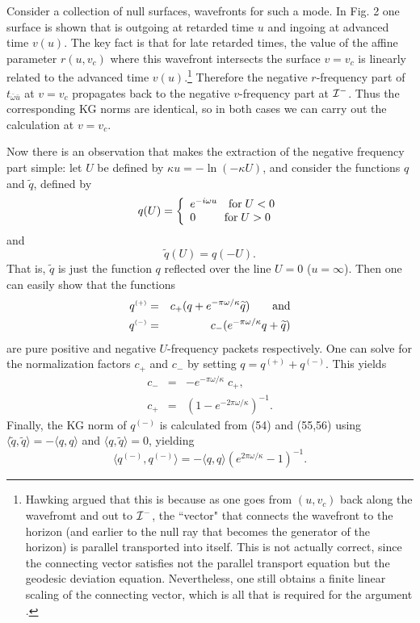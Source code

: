 \documentclass[12pt]{article}
\def\o{\omega}
\def\obar{\bar{\omega}}
\def\ubar{\bar{u}}
\def\la{\langle}
\def\ra{\rangle}
\def\pastI{{\cal I}^-}
\begin{document}
Consider a collection of null surfaces, wavefronts for such a mode.
In Fig. 2 one surface is shown that is outgoing at
retarded time $u$ and ingoing at advanced time $v(u)$. The
key fact is that for late retarded times,
the value of the affine parameter $r(u,v_c)$ where this
wavefront intersects the surface $v=v_c$ is linearly
related to the advanced time $v(u)$.\footnote{Hawking
argued that this is because as one goes from $(u,v_c)$ back
along the wavefromt and out to $\pastI$, the ``vector" that
connects the wavefront to the horizon (and earlier to the null
ray that becomes the generator of the horizon) is parallel
transported into itself. This is not actually correct, since
the connecting vector satisfies not the parallel transport
equation but the geodesic deviation equation. Nevertheless,
one still obtains a finite linear scaling of the connecting vector,
which is all that is required for the argument \cite{WaldGR}.}
Therefore the negative
$r$-frequency part of $t_{\obar\ubar}$ at $v=v_c$ propagates
back to the negative $v$-frequency part at $\pastI$. Thus
the corresponding KG norms are identical, so in both cases
we can carry out the calculation at $v=v_c$.

Now there is an observation \cite{Notes,Wald75} that makes the
extraction of the negative frequency part simple: let
$U$ be defined by $\kappa u=-\ln(-\kappa U)$, and consider
the functions $q$ and $\widetilde q$, defined by
\begin{equation}
q(U)=\left\{
\begin{array}{l}
e^{-i\omega u} \quad {\rm for}\;  U<0\\
0\quad\quad\; \; {\rm for}\;  U>0
\end{array}\right.
\end{equation}
and
\begin{equation}\widetilde{q}(U)=q(-U).
\end{equation}
That is, $\widetilde q$ is just the function $q$ reflected over
the line $U=0$ ($u=\infty$). Then one can easily show that
the functions
\begin{eqnarray}
q^{\scriptscriptstyle(+)}&=&c_{+}
(q+e^{-\pi\o/\kappa}\widetilde{q})
\qquad {\rm and}\label{q+}\\
q^{\scriptscriptstyle(-)}&=&c_{-}
(e^{-\pi\o/\kappa}q+\widetilde{q})
\end{eqnarray}
are pure positive and negative $U$-frequency packets
respectively. One can solve for the normalization factors
$c_{+}$ and $c_{-}$ by setting
$q=q^{\scriptscriptstyle(+)}+q^{\scriptscriptstyle(-)}$.
This yields
\begin{eqnarray}
c_{-}&=&-e^{-\pi\o/\kappa}\; c_{+},\\
c_{+}&=&(1-e^{-2\pi\o/\kappa})^{-1}.
\end{eqnarray}
Finally, the KG norm of $q^{\scriptscriptstyle(-)}$ is
calculated from (54) and (55,56) using
$\la\widetilde{q},\widetilde{q}\ra=-\la q,q\ra$ and $\la
q,\widetilde{q}\ra=0$, yielding
\begin{equation}
\la q^{\scriptscriptstyle(-)},q^{\scriptscriptstyle(-)}\ra
=-\la q,q\ra (e^{2\pi\o/\kappa}-1)^{-1}.
\end{equation}
\end{document}
